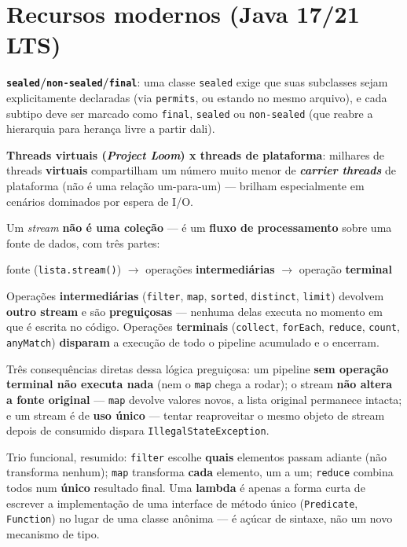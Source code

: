 \section{Recursos modernos (Java 17/21 LTS)}

\begin{conceito}
\textbf{\texttt{sealed}/\texttt{non-sealed}/\texttt{final}}: uma classe
\texttt{sealed} exige que suas subclasses sejam explicitamente declaradas
(via \texttt{permits}, ou estando no mesmo arquivo), e cada subtipo deve
ser marcado como \texttt{final}, \texttt{sealed} ou \texttt{non-sealed}
(que reabre a hierarquia para herança livre a partir dali).

\textbf{Threads virtuais (\textit{Project Loom}) x threads de
plataforma}: milhares de threads \textbf{virtuais} compartilham um número
muito menor de \textbf{\textit{carrier threads}} de plataforma (não é uma
relação um-para-um) --- brilham especialmente em cenários dominados por
espera de I/O.
\end{conceito}

\begin{conceito}
Um \textit{stream} \textbf{não é uma coleção} --- é um \textbf{fluxo de
processamento} sobre uma fonte de dados, com três partes:

\begin{center}
fonte (\texttt{lista.stream()}) $\to$ operações \textbf{intermediárias}
$\to$ operação \textbf{terminal}
\end{center}

Operações \textbf{intermediárias} (\texttt{filter}, \texttt{map},
\texttt{sorted}, \texttt{distinct}, \texttt{limit}) devolvem \textbf{outro
stream} e são \textbf{preguiçosas} --- nenhuma delas executa no momento
em que é escrita no código. Operações \textbf{terminais}
(\texttt{collect}, \texttt{forEach}, \texttt{reduce}, \texttt{count},
\texttt{anyMatch}) \textbf{disparam} a execução de todo o pipeline
acumulado e o encerram.

Três consequências diretas dessa lógica preguiçosa: um pipeline
\textbf{sem operação terminal não executa nada} (nem o \texttt{map} chega
a rodar); o stream \textbf{não altera a fonte original} ---
\texttt{map} devolve valores novos, a lista original permanece intacta; e
um stream é de \textbf{uso único} --- tentar reaproveitar o mesmo objeto
de stream depois de consumido dispara \texttt{IllegalStateException}.

Trio funcional, resumido: \texttt{filter} escolhe \textbf{quais}
elementos passam adiante (não transforma nenhum); \texttt{map}
transforma \textbf{cada} elemento, um a um; \texttt{reduce} combina todos
num \textbf{único} resultado final. Uma \textbf{lambda} é apenas a forma
curta de escrever a implementação de uma interface de método único
(\texttt{Predicate}, \texttt{Function}) no lugar de uma classe anônima
--- é açúcar de sintaxe, não um novo mecanismo de tipo.
\end{conceito}

